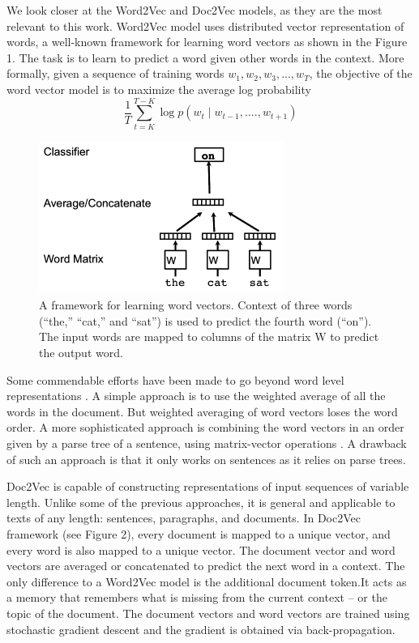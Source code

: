 \documentclass[12pt,a4paper] {article}
\begin{document}
	We look closer at the Word2Vec and Doc2Vec models, as they are the most relevant to this work. Word2Vec model uses distributed vector representation of words, a well-known framework for learning word vectors as shown in the Figure 1. The task is to learn to predict a word given other words in the context.
	More formally, given a sequence of training words
	$w_{1}, w_{2}, w_{3}, ..., w_{T} $, the objective of the word vector model is to maximize the average log probability
	\\
	\begin{equation}
	\frac{1}{T} \sum_{t=K}^{T-K} \log p(w_{t} \mid w_{t-1},....,w_{t+1}) 
	\end{equation}
	
	\begin{figure}[h]
		\centering
		\includegraphics[width=8cm, height=5cm]{w2v.png}
		\caption[]{A framework for learning word vectors. Context of
			three words (“the,” “cat,” and “sat”) is used to predict the fourth
			word (“on”). The input words are mapped to columns of the matrix
			W to predict the output word.}
		\label{fig:Word2Vec model}
	\end{figure}
	Some commendable efforts have been made to go beyond word level representations  \cite{mitchell2010composition}  \cite{zanzotto2010estimating} 
	\cite{yessenalina2011compositional}  \cite{grefenstette2013multi}  \cite{mikolov2013distributed}. A simple approach is to use the weighted average of all the words in the document. But weighted averaging of word vectors loses the word order. A more sophisticated approach is combining the word vectors
	in an order given by a parse tree of a sentence, using
	matrix-vector operations \cite{socher2011dynamic}. A drawback of such an approach is that it only works on sentences as it relies on parse trees.
	
	Doc2Vec is capable of constructing representations
	of input sequences of variable length. Unlike some of the
	previous approaches, it is general and applicable to texts of
	any length: sentences, paragraphs, and documents. In Doc2Vec framework (see Figure 2), every
	document is mapped to a unique vector, and every word is also mapped to a
	unique vector. The document vector and word vectors are averaged or concatenated
	to predict the next word in a context. The only difference to a Word2Vec model is the additional document token.It
	acts as a memory that remembers what is missing from the
	current context – or the topic of the document. The document vectors and word vectors are trained using stochastic gradient descent and the gradient is obtained via back-propagation.
	
\end{document}
